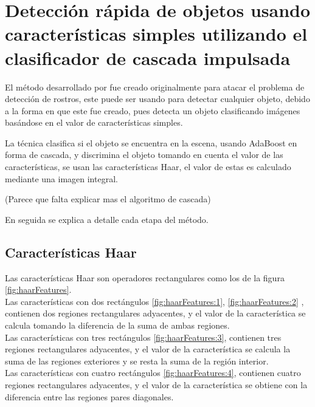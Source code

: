  
\section{Detección rápida de objetos usando características simples utilizando el clasificador de cascada impulsada}\label{sec:ViolaJones}

El m\'etodo  desarrollado por \citep{Viola2001} fue creado originalmente para atacar el problema de detección de rostros, este puede ser usando para detectar cualquier objeto, debido a la forma en que este fue creado, pues detecta un objeto clasificando imágenes basándose en el valor de características simples.

La técnica clasifica si el objeto se encuentra en la escena, usando AdaBoost en forma de cascada, y discrimina el objeto tomando en cuenta el valor de las características, se usan las características Haar, el valor de estas es calculado mediante una imagen integral.

(Parece que falta explicar mas el algoritmo de cascada) 

En seguida se explica a detalle cada etapa del método. 

\subsection{Características Haar}\label{subsec:CaracteristicasHaar}  

Las características Haar son operadores rectangulares como los de la figura \ref{fig:haarFeatures}.\\ 
Las características con dos rectángulos \ref{fig:haarFeatures:1}, \ref{fig:haarFeatures:2} , contienen dos regiones rectangulares adyacentes, y el valor de la característica se calcula tomando la diferencia de la suma de ambas regiones.\\ 
Las características con tres rectángulos \ref{fig:haarFeatures:3}, contienen tres regiones rectangulares adyacentes, y el valor de la característica se calcula la suma de las regiones exteriores y se resta la suma de la región interior.\\ 
Las características con cuatro rectángulos \ref{fig:haarFeatures:4}, contienen cuatro regiones rectangulares adyacentes, y el valor de la característica se obtiene con la diferencia entre las regiones pares diagonales.

